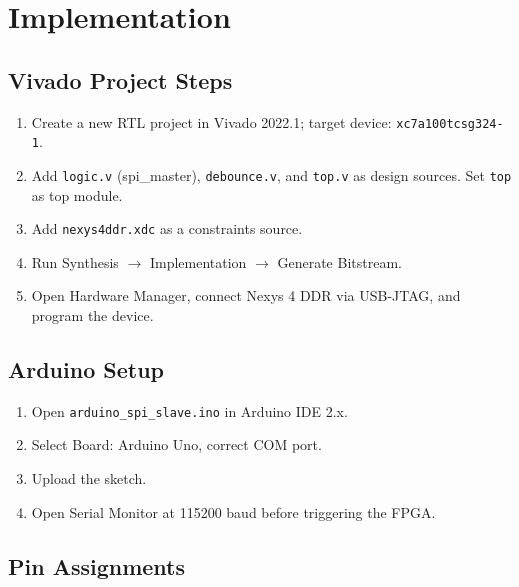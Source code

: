 \documentclass[12pt,a4paper]{report}
\begin{document}
\chapter{Implementation}

\section{Vivado Project Steps}

\begin{enumerate}[leftmargin=1.5em]
  \item Create a new RTL project in Vivado 2022.1; target device: \texttt{xc7a100tcsg324-1}.
  \item Add \texttt{logic.v} (spi\_master), \texttt{debounce.v}, and \texttt{top.v} as design sources. Set \texttt{top} as top module.
  \item Add \texttt{nexys4ddr.xdc} as a constraints source.
  \item Run Synthesis $\to$ Implementation $\to$ Generate Bitstream.
  \item Open Hardware Manager, connect Nexys 4 DDR via USB-JTAG, and program the device.
\end{enumerate}

\section{Arduino Setup}

\begin{enumerate}[leftmargin=1.5em]
  \item Open \texttt{arduino\_spi\_slave.ino} in Arduino IDE 2.x.
  \item Select Board: Arduino Uno, correct COM port.
  \item Upload the sketch.
  \item Open Serial Monitor at 115200 baud before triggering the FPGA.
\end{enumerate}

\section{Pin Assignments}
\end{document}
